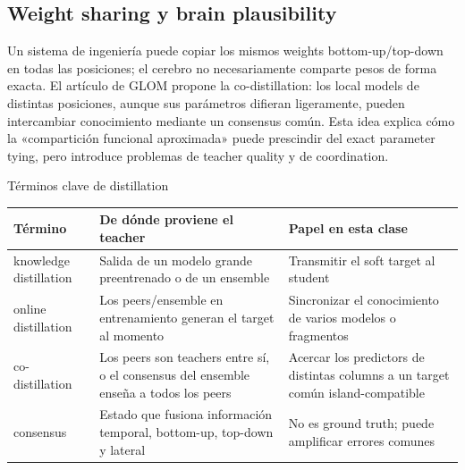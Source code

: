 \subsection{Weight sharing y brain plausibility}

Un sistema de ingeniería puede copiar los mismos weights bottom-up/top-down en todas las posiciones; el cerebro no necesariamente comparte pesos de forma exacta. El artículo de GLOM propone la co-distillation: los local models de distintas posiciones, aunque sus parámetros difieran ligeramente, pueden intercambiar conocimiento mediante un consensus común. Esta idea explica cómo la «compartición funcional aproximada» puede prescindir del exact parameter tying, pero introduce problemas de teacher quality y de coordination.


\begin{knowledgebox}{Términos clave de distillation}
\begin{tabularx}{\textwidth}{L{0.22\textwidth}L{0.30\textwidth}X}
\toprule
Término & De dónde proviene el teacher & Papel en esta clase \\
\midrule
knowledge distillation & Salida de un modelo grande preentrenado o de un ensemble & Transmitir el soft target al student \\
online distillation & Los peers/ensemble en entrenamiento generan el target al momento & Sincronizar el conocimiento de varios modelos o fragmentos \\
co-distillation & Los peers son teachers entre sí, o el consensus del ensemble enseña a todos los peers & Acercar los predictors de distintas columns a un target común island-compatible \\
consensus & Estado que fusiona información temporal, bottom-up, top-down y lateral & No es ground truth; puede amplificar errores comunes \\
\bottomrule
\end{tabularx}
\end{knowledgebox}

